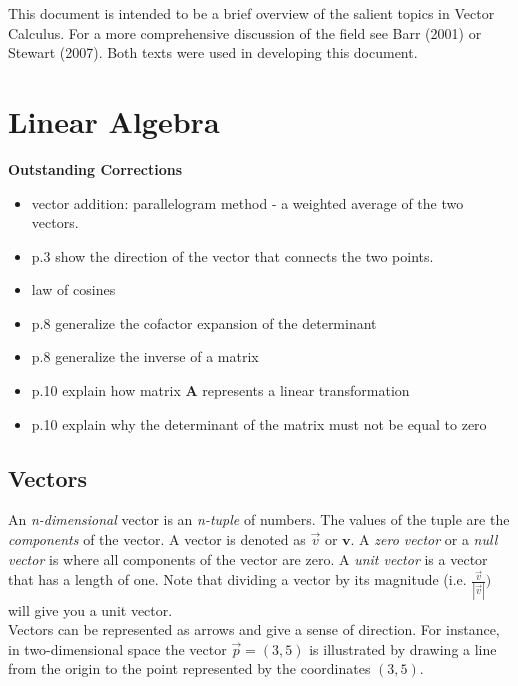 \documentclass[12pt]{article}
\begin{document}

\def\ci{\perp\!\!\!\perp}
\def\ex{\mathbb{E}}
\def\prob{\mathbb{P}}
\def\ind{\mathbb{I}}
\def\grad{\triangledown}
\def\bigo{\mathcal{O}}

\def\real{\mathbb{R}}
\def\p#1#2{\frac{\partial #1}{\partial #2}}

 This document is intended to be a brief overview of the salient topics in Vector Calculus. For a more comprehensive discussion of the field see Barr (2001) or Stewart (2007). Both texts were used in developing this document. \\ 

\section{Linear Algebra}
{\color{red}
\textbf{Outstanding Corrections}
\begin{itemize}
\item vector addition: parallelogram method - a weighted average of the two vectors. 
\item p.3 show the direction of the vector that connects the two points. 
\item law of cosines
\item p.8 generalize the cofactor expansion of the determinant
\item p.8 generalize the inverse of a matrix
\item p.10 explain how matrix $\mathbf{A}$ represents a linear transformation 
\item p.10 explain why the determinant of the matrix must not be equal to zero
\end{itemize}
}

\subsection{Vectors}

An \emph{n-dimensional} vector is an \emph{n-tuple} of numbers. The values of the tuple are the \emph{components} of the vector. A vector is denoted as $\vec{v}$ or $\mathbf{v}$. A \emph{zero vector} or a \emph{null vector} is where all components of the vector are zero. A \emph{unit vector} is a vector that has a length of one. Note that dividing a vector by its magnitude (i.e. $\frac{\vec{v}}{|\vec{v}|})$ will give you a unit vector. \\

Vectors can be represented as arrows and give a sense of direction. For instance, in two-dimensional space the vector $\vec{p}=(3,5)$ is illustrated by drawing a line from the origin to the point represented by the coordinates $(3,5)$. \\
\end{document}
